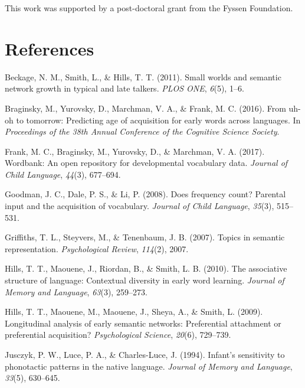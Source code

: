 \documentclass[10pt, letterpaper]{article}
\begin{document}
This work was supported by a post-doctoral grant from the Fyssen
Foundation.

\section{References}\label{references}

\setlength{\parindent}{-0.1in} \setlength{\leftskip}{0.125in} \noindent

\hypertarget{refs}{}
\hypertarget{ref-beckage2011}{}
Beckage, N. M., Smith, L., \& Hills, T. T. (2011). Small worlds and
semantic network growth in typical and late talkers. \emph{PLOS ONE},
\emph{6}(5), 1--6.

\hypertarget{ref-braginsky2016}{}
Braginsky, M., Yurovsky, D., Marchman, V. A., \& Frank, M. C. (2016).
From uh-oh to tomorrow: Predicting age of acquisition for early words
across languages. In \emph{Proceedings of the 38th Annual Conference of
the Cognitive Science Society}.

\hypertarget{ref-frank2017}{}
Frank, M. C., Braginsky, M., Yurovsky, D., \& Marchman, V. A. (2017).
Wordbank: An open repository for developmental vocabulary data.
\emph{Journal of Child Language}, \emph{44}(3), 677--694.

\hypertarget{ref-goodman2008}{}
Goodman, J. C., Dale, P. S., \& Li, P. (2008). Does frequency count?
Parental input and the acquisition of vocabulary. \emph{Journal of Child
Language}, \emph{35}(3), 515--531.

\hypertarget{ref-griffiths07}{}
Griffiths, T. L., Steyvers, M., \& Tenenbaum, J. B. (2007). Topics in
semantic representation. \emph{Psychological Review}, \emph{114}(2),
2007.

\hypertarget{ref-hills2010}{}
Hills, T. T., Maouene, J., Riordan, B., \& Smith, L. B. (2010). The
associative structure of language: Contextual diversity in early word
learning. \emph{Journal of Memory and Language}, \emph{63}(3), 259--273.

\hypertarget{ref-hills2009}{}
Hills, T. T., Maouene, M., Maouene, J., Sheya, A., \& Smith, L. (2009).
Longitudinal analysis of early semantic networks: Preferential
attachment or preferential acquisition? \emph{Psychological Science},
\emph{20}(6), 729--739.

\hypertarget{ref-jusczyk1994}{}
Jusczyk, P. W., Luce, P. A., \& Charles-Luce, J. (1994). Infant's
sensitivity to phonotactic patterns in the native language.
\emph{Journal of Memory and Language}, \emph{33}(5), 630--645.
\end{document}
